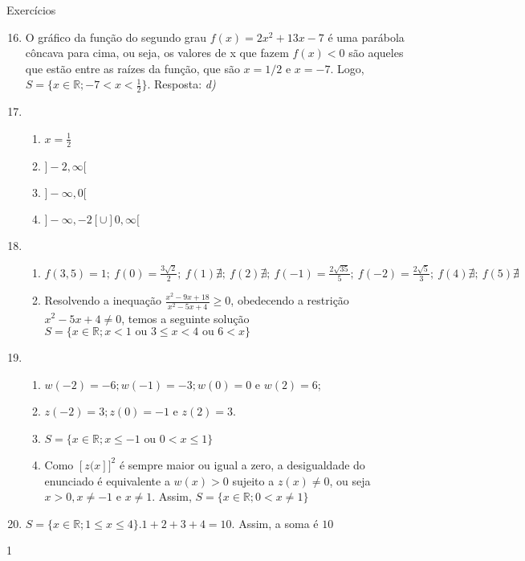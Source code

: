 \begin{answer}{Exercícios}
{\exerciselist
\begin{enumerate}\setcounter{enumi}{15}
\item O gráfico da função do segundo grau $f(x) = 2x^2 + 13x -7$ é uma parábola côncava para cima, ou seja, os valores de x que fazem $f(x)<0$ são aqueles que estão entre as raízes da função, que são $x=1/2$ e $x=-7$. Logo, $S=\{x\in \mathbb{R};-7<x<\frac{1}{2}\}$. Resposta: \textit{d)}

\item 
\begin{enumerate}
\item $x=\frac{1}{2}$
\item $]-2, \infty[$
\item $]-\infty, 0[$
\item $]-\infty, -2[ \cup ]0, \infty[$
\end{enumerate}

\item 
\begin{enumerate}
\item $f(3,5)=1;\ f(0)=\frac{3\sqrt{2}}{2};\ f(1)\nexists;\ f(2)\nexists;\ f(-1)=\frac{2\sqrt{35}}{5};\ f(-2)=\frac{2\sqrt{5}}{3} ;\ f(4) \nexists;\ f(5) \nexists$
\item Resolvendo a inequação $\frac{x^2-9x+18}{x^2-5x+4}\geq 0$, obedecendo a restrição $x^2-5x+4\neq 0$, temos a seguinte solução $S=\{ x\in \mathbb{R};x<1 \mbox{ ou } 3\leq x < 4 \mbox{ ou }6< x  \}$ 
\end{enumerate}

\setcounter{enumi}{19}
\item 
\begin{enumerate}
\item $w(-2)=-6; w(-1)=-3; w(0)=0$ e $w(2)=6$;
\item $z(-2)=3; z(0) = -1$ e $z(2) = 3$.
\item $S=\{x \in \mathbb{R}; x\leq -1 \mbox{ ou } 0<x\leq 1\}$
\item Como $[z(x]]^2$ é sempre maior ou igual a zero, a desigualdade do enunciado é equivalente a $w(x)>0$ sujeito a $z(x)\neq 0$, ou seja $x>0, x\neq -1$ e $x\neq 1$. Assim, $S=\{x\in \mathbb{R}; 0<x\neq 1\}$
\end{enumerate}

\item $ S=\{x \in \mathbb{R}; 1\leq x \leq 4\}. 1+2+3+4=10 $. Assim, a soma é $10$
\end{enumerate}
}{1}
\end{answer}
\clearmargin

